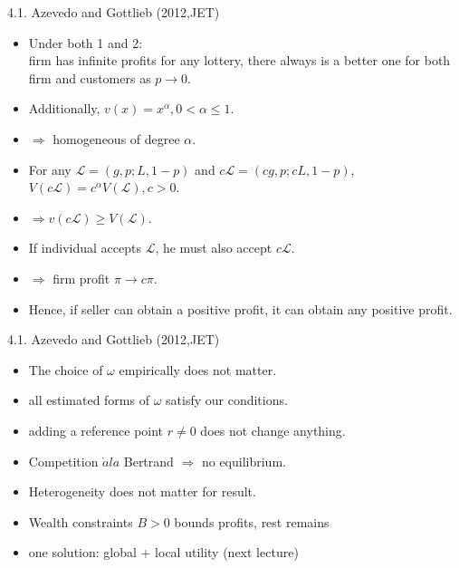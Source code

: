 \documentclass[11pt,aspectratio=169]{beamer}
\begin{document}
\begin{frame}{4.1. Azevedo and Gottlieb (2012,JET)}
    \begin{itemize}
        \item Under both 1 and 2: \\
        firm has infinite profits for any lottery, there always is a better one for both firm and customers as $p \rightarrow 0$.\\
        \item Additionally, $v(x)=x^\alpha, 0<\alpha \leq 1$.\\
        \item $\Rightarrow$ homogeneous of degree $\alpha$.\\
        \item For any $\mathcal{L} =(g,p;L,1-p) $ and 
        $c\mathcal{L} =(cg,p;cL,1-p) $, \\
        $V(c\mathcal{L}) = c^\alpha V(\mathcal{L}),  c>0 $.\\
        \item $\Rightarrow v(c\mathcal{L}) \geq  V(\mathcal{L})$.\\
        \item If individual accepts $\mathcal{L}$, he must also accept $c\mathcal{L}$.\\
        \item $\Rightarrow$ firm profit $\pi \rightarrow c\pi$.\\
        \item Hence, if seller can obtain a positive profit, it can obtain any positive profit.
    \end{itemize}
\end{frame}

\begin{frame}{4.1. Azevedo and Gottlieb (2012,JET)}
    \begin{itemize}
        \item The choice of $\omega $ empirically does not matter.\\
        \item all estimated forms of $\omega$ satisfy our conditions.\\
        \item adding a reference point $r\neq 0$ does not change anything.\\
        \item Competition $\grave{a}  la$ Bertrand $\Rightarrow$ no equilibrium. \\
        \item Heterogeneity does not matter for result.\\
        \item Wealth constraints $B>0$ bounds profits, rest remains\\
        \item one solution: global + local utility (next lecture)
    \end{itemize}
\end{frame}
\end{document}
